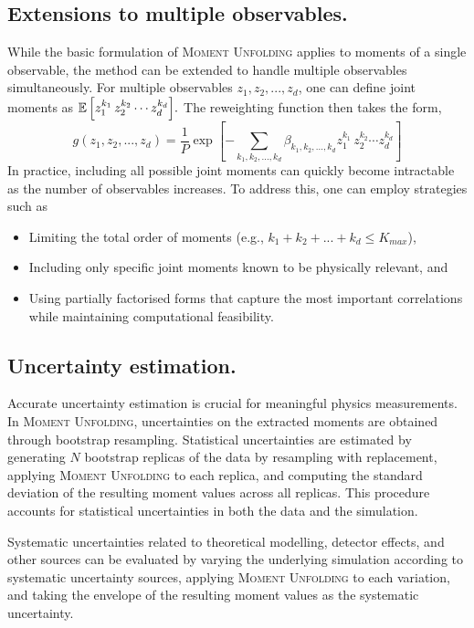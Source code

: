     \subsection{Extensions to multiple observables.}
        While the basic formulation of \textsc{Moment Unfolding} applies to moments of a single observable, the method can be extended to handle multiple observables simultaneously.
        For multiple observables $z_1, z_2, ..., z_d$, one can define joint moments as \(\operatorname{\mathbb{E}}\qty[z_1^{k_1}\, z_2^{k_2} \cdots z_d^{k_d}].\)
        The reweighting function then takes the form,
        \[
            g(z_1, z_2, ..., z_d) = \frac{1}{P}\exp\left[-\sum_{k_1, k_2, ..., k_d} \beta_{k_1, k_2, ..., k_d} z_1^{k_1}\, z_2^{k_2} \cdots z_d^{k_d}\right]
        \]
        In practice, including all possible joint moments can quickly become intractable as the number of observables increases.
        To address this, one can employ strategies such as
        \begin{itemize}
            \item Limiting the total order of moments (e.g., $k_1 + k_2 + ... + k_d \leq K_{max}$),
            \item Including only specific joint moments known to be physically relevant, and
            \item Using partially factorised forms that capture the most important correlations while maintaining computational feasibility.
        \end{itemize}
    \subsection{Uncertainty estimation.}
        Accurate uncertainty estimation is crucial for meaningful physics measurements.
        In \textsc{Moment Unfolding}, uncertainties on the extracted moments are obtained through bootstrap resampling.
        Statistical uncertainties are estimated by generating $N$ bootstrap replicas of the data by resampling with replacement,
        applying \textsc{Moment Unfolding} to each replica, and
        computing the standard deviation of the resulting moment values across all replicas.
        This procedure accounts for statistical uncertainties in both the data and the simulation.
        
        Systematic uncertainties related to theoretical modelling, detector effects, and other sources can be evaluated by
        varying the underlying simulation according to systematic uncertainty sources, applying \textsc{Moment Unfolding} to each variation, and
        taking the envelope of the resulting moment values as the systematic uncertainty.

